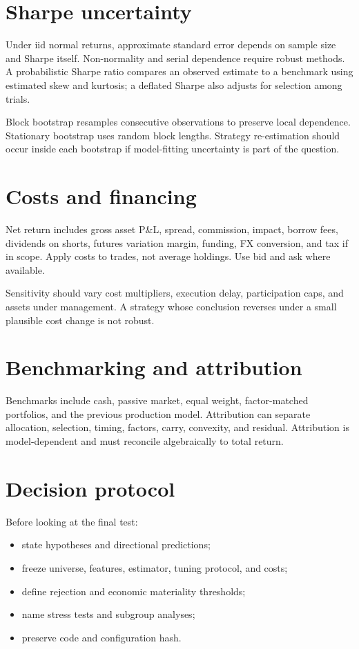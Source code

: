 \section{Sharpe uncertainty}

Under iid normal returns, approximate standard error depends on sample size and
Sharpe itself. Non-normality and serial dependence require robust methods. A
probabilistic Sharpe ratio compares an observed estimate to a benchmark using
estimated skew and kurtosis; a deflated Sharpe also adjusts for selection among
trials.

Block bootstrap resamples consecutive observations to preserve local dependence.
Stationary bootstrap uses random block lengths. Strategy re-estimation should occur
inside each bootstrap if model-fitting uncertainty is part of the question.

\section{Costs and financing}

Net return includes gross asset P\&L, spread, commission, impact, borrow fees,
dividends on shorts, futures variation margin, funding, FX conversion, and tax if in
scope. Apply costs to trades, not average holdings. Use bid and ask where available.

Sensitivity should vary cost multipliers, execution delay, participation caps, and
assets under management. A strategy whose conclusion reverses under a small plausible
cost change is not robust.

\section{Benchmarking and attribution}

Benchmarks include cash, passive market, equal weight, factor-matched portfolios,
and the previous production model. Attribution can separate allocation, selection,
timing, factors, carry, convexity, and residual. Attribution is model-dependent and
must reconcile algebraically to total return.

\section{Decision protocol}

Before looking at the final test:

\begin{itemize}
\item state hypotheses and directional predictions;
\item freeze universe, features, estimator, tuning protocol, and costs;
\item define rejection and economic materiality thresholds;
\item name stress tests and subgroup analyses;
\item preserve code and configuration hash.
\end{itemize}

